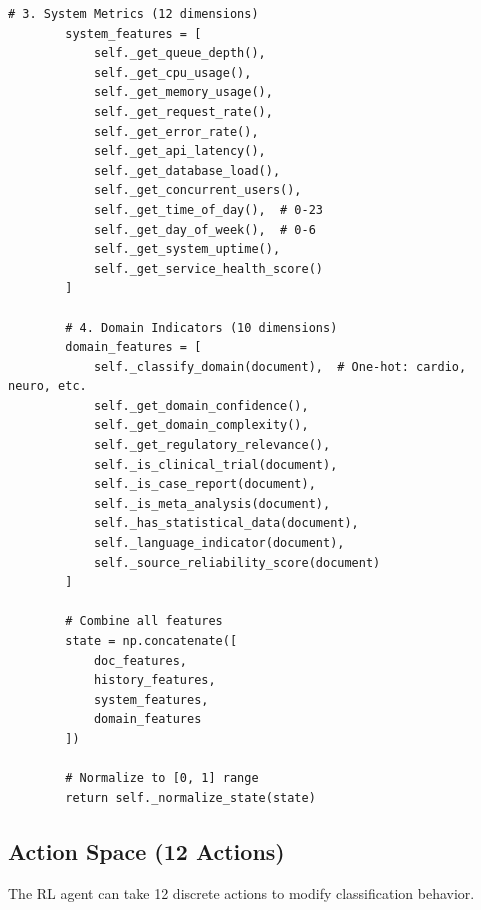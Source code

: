 \begin{lstlisting}[style=pythonstyle]
        # 3. System Metrics (12 dimensions)
        system_features = [
            self._get_queue_depth(),
            self._get_cpu_usage(),
            self._get_memory_usage(),
            self._get_request_rate(),
            self._get_error_rate(),
            self._get_api_latency(),
            self._get_database_load(),
            self._get_concurrent_users(),
            self._get_time_of_day(),  # 0-23
            self._get_day_of_week(),  # 0-6
            self._get_system_uptime(),
            self._get_service_health_score()
        ]
        
        # 4. Domain Indicators (10 dimensions)
        domain_features = [
            self._classify_domain(document),  # One-hot: cardio, neuro, etc.
            self._get_domain_confidence(),
            self._get_domain_complexity(),
            self._get_regulatory_relevance(),
            self._is_clinical_trial(document),
            self._is_case_report(document),
            self._is_meta_analysis(document),
            self._has_statistical_data(document),
            self._language_indicator(document),
            self._source_reliability_score(document)
        ]
        
        # Combine all features
        state = np.concatenate([
            doc_features,
            history_features,
            system_features,
            domain_features
        ])
        
        # Normalize to [0, 1] range
        return self._normalize_state(state)
\end{lstlisting}

\subsection{Action Space (12 Actions)}

The RL agent can take 12 discrete actions to modify classification behavior.

